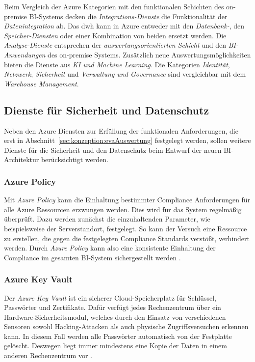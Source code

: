 Beim Vergleich der Azure Kategorien mit den funktionalen Schichten des on-premise BI-Systems decken die \textit{Integrations-Dienste} die Funktionalität der \textit{Datenintegration} ab. Das \ac{dwh} kann in Azure entweder mit den \textit{Datenbank-}, den \textit{Speicher-Diensten} oder einer Kombination von beiden ersetzt werden. Die \textit{Analyse-Dienste} entsprechen der \textit{auswertungsorientierten Schicht} und den \textit{BI-Anwendungen} des on-premise Systems. Zusätzlich neue Auswertungsmöglichkeiten bieten die Dienste aus \textit{KI und Machine Learning}. Die Kategorien \textit{Identität}, \textit{Netzwerk}, \textit{Sicherheit} und \textit{Verwaltung und Governance} sind vergleichbar mit dem \textit{Warehouse Management}.

\subsection{Dienste für Sicherheit und Datenschutz} \label{subsec:grundlagen:azure:sicherheitUndDatenschutz}
Neben den Azure Diensten zur Erfüllung der funktionalen Anforderungen, die erst in Abschnitt~\ref{sec:konzeption:evaAuswertung} festgelegt werden, sollen weitere Dienste für die Sicherheit und den Datenschutz beim Entwurf der neuen BI-Architektur berücksichtigt werden.

\subsubsection{Azure Policy} \label{subsec:grundlagen:azure:sicherheitUndDatenschutz:ap}
Mit \textit{Azure Policy} kann die Einhaltung bestimmter Compliance Anforderungen für alle Azure Ressourcen erzwungen werden. Dies wird für das System regelmäßig überprüft. Dazu werden zunächst die einzuhaltenden Parameter, wie beispielsweise der Serverstandort, festgelegt. So kann der Versuch eine Ressource zu erstellen, die gegen die festgelegten Compliance Standards verstößt, verhindert werden. Durch \textit{Azure Policy} kann also eine konsistente Einhaltung der Compliance im gesamten BI-System sichergestellt werden \cite{stefanovic_azure_2021}.

\subsubsection{Azure Key Vault} \label{subsec:grundlagen:azure:sicherheitUndDatenschutz:keyVault}
Der \textit{Azure Key Vault} ist ein sicherer Cloud-Speicherplatz für Schlüssel, Passwörter und Zertifikate. Dafür verfügt jedes Rechenzentrum über ein Hardware-Sicherheitsmodul, welches durch den Einsatz von verschiedenen Sensoren sowohl Hacking-Attacken als auch physische Zugriffsversuchen erkennen kann. In diesem Fall werden alle Passwörter automatisch von der Festplatte gelöscht. Deswegen liegt immer mindestens eine Kopie der Daten in einem anderen Rechenzentrum vor \cite{haunts_key_2019}.

